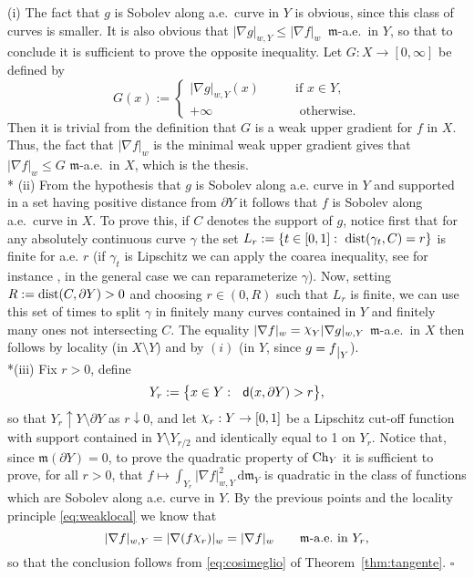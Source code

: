 \documentclass[reqno,11pt]{article}
\numberwithin{equation}{section}
\newcommand{\C}{\mathbb{C}}
\newcommand{\mm}{{\mbox{\boldmath$m$}}}
\newcommand{\sfd}{{\sf d}}
\renewcommand{\d}{{\mathrm d}}
\newcommand{\restr}[1]{\lower3pt\hbox{$|_{#1}$}}
\newcommand{\nchi}{{\raise.3ex\hbox{$\chi$}}}
\newenvironment{proof}{\removelastskip\par\medskip   %
\noindent{\em Proof.}
\rm}{\penalty-20\null\hfill$\square$\par\medbreak}
\newcommand{\weakgrad}[1]{|\nabla #1|_w}                %
\renewcommand{\C}{{\rm Ch}}
\newcommand{\weakgrado}[2]{|\nabla #1|_{w,#2}}                %
\renewcommand{\mm}{\mathfrak m}
\begin{document}
\begin{proof} {(i)} The fact that $g$ is Sobolev along a.e.~curve in $Y$ is
obvious, since this class of curves is smaller. It is also obvious
that $\weakgrado gY\leq\weakgrad f\ $ $\mm$-a.e.~in $Y$, so that to
conclude it is sufficient to prove the opposite inequality. Let
$G:X\to[0,\infty]$ be defined by
\begin{equation}
\label{eq:sembrafunzioni}
G(x):=\left\{
\begin{array}{ll}
\weakgrado gY (x)&\qquad\textrm{if }x\in Y,\\
+\infty&\qquad\textrm{ otherwise}.
\end{array}
\right.
\end{equation}
Then it is trivial from the definition that $G$ is a weak upper
gradient for $f$ in $X$. Thus, the fact that $\weakgrad f$ is the
minimal weak upper gradient gives that $\weakgrad f\leq G$
$\mm$-a.e.~in $X$, which is the thesis.\\* {(ii)} From the
hypothesis that $g$ is Sobolev along a.e. curve in $Y$ and supported
in a set having positive distance from $\partial Y$ it follows that
$f$ is Sobolev along a.e.~curve in $X$. To prove this, if $C$
denotes the support of $g$, notice first that for any absolutely
continuous curve $\gamma$ the set $L_r:=\{t\in [0,1]:\ {\rm
dist}(\gamma_t,C)=r\}$ is finite for a.e. $r$ (if $\gamma_t$ is
Lipschitz we can apply the coarea inequality, see for instance
\cite[Corollary~2.10.11]{Federer69}, in the general case we can
reparameterize $\gamma$). Now, setting $R:={\rm dist}(C,\partial
Y)>0$ and choosing $r\in (0,R)$ such that $L_r$ is finite, we can
use this set of times to split $\gamma$ in finitely many curves
contained in $Y$ and finitely many ones not intersecting $C$. The
equality $\weakgrad f=\nchi_Y\weakgrado {g}Y$ $\mm$-a.e.~in $X$ then
follows by locality (in $X\setminus Y$) and by $(i)$ (in $Y$, since
$g=f\restr{Y}$).
\\*{(iii)}
 Fix $r>0$, define
\[
Y_r:=\bigl\{x\in Y:\ \ \sfd(x,\partial Y)>r\bigr\},
\]
so that $Y_r\uparrow Y\setminus\partial Y$ as $r\downarrow 0$, and
let $\nchi_r:Y\to[0,1]$ be a Lipschitz cut-off function with support
contained in $Y\setminus Y_{r/2}$ and identically equal to 1 on
$Y_r$. Notice that, since $\mm(\partial Y)=0$, to prove the
quadratic property of $\C_Y$ it is sufficient to prove, for all
$r>0$, that $f\mapsto\int_{Y_r}\weakgrado f{Y}^2\,\d\mm_Y$ is
quadratic in the class of functions which are Sobolev along a.e.
curve in $Y$. By the previous points and the locality principle
\eqref{eq:weaklocal} we know that
\[
\weakgrado f{Y}=\weakgrad{(f\nchi_r)}=\weakgrad
f\qquad\text{$\mm$-a.e.~in $Y_r$,}
\]
so that the conclusion follows from \eqref{eq:cosimeglio} of
Theorem~\ref{thm:tangente}.
\end{proof}
\end{document}
